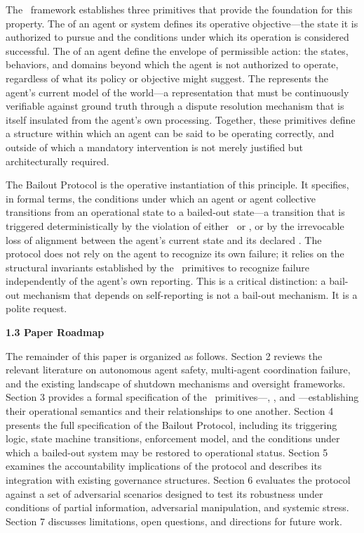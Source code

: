 The \bxthree\ framework establishes three primitives that provide the foundation for this property. The \textbf{\purpose} of an agent or system defines its operative objective—the state it is authorized to pursue and the conditions under which its operation is considered successful. The \textbf{\bounds} of an agent define the envelope of permissible action: the states, behaviors, and domains beyond which the agent is not authorized to operate, regardless of what its policy or objective might suggest. The \textbf{\fact} represents the agent's current model of the world—a representation that must be continuously verifiable against ground truth through a dispute resolution mechanism that is itself insulated from the agent's own processing. Together, these primitives define a structure within which an agent can be said to be operating correctly, and outside of which a mandatory intervention is not merely justified but architecturally required.

The Bailout Protocol is the operative instantiation of this principle. It specifies, in formal terms, the conditions under which an agent or agent collective transitions from an operational state to a bailed-out state—a transition that is triggered deterministically by the violation of either \bounds\ or \fact, or by the irrevocable loss of alignment between the agent's current state and its declared \purpose. The protocol does not rely on the agent to recognize its own failure; it relies on the structural invariants established by the \bxthree\ primitives to recognize failure independently of the agent's own reporting. This is a critical distinction: a bail-out mechanism that depends on self-reporting is not a bail-out mechanism. It is a polite request.

\bigskip
\noindent\textbf{1.3 Paper Roadmap}

The remainder of this paper is organized as follows. Section 2 reviews the relevant literature on autonomous agent safety, multi-agent coordination failure, and the existing landscape of shutdown mechanisms and oversight frameworks. Section 3 provides a formal specification of the \bxthree\ primitives—\purpose, \bounds, and \fact—establishing their operational semantics and their relationships to one another. Section 4 presents the full specification of the Bailout Protocol, including its triggering logic, state machine transitions, enforcement model, and the conditions under which a bailed-out system may be restored to operational status. Section 5 examines the accountability implications of the protocol and describes its integration with existing governance structures. Section 6 evaluates the protocol against a set of adversarial scenarios designed to test its robustness under conditions of partial information, adversarial manipulation, and systemic stress. Section 7 discusses limitations, open questions, and directions for future work.

